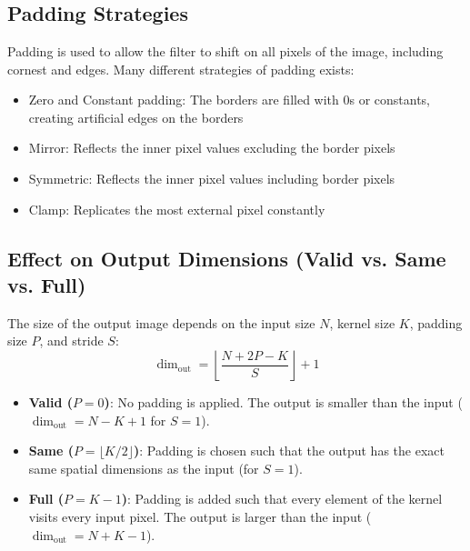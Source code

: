 
\section[Question -- {\it Padding}]{}

\subsection{Padding Strategies}

Padding is used to allow the filter to shift on all pixels of the image, including cornest and edges.
Many different strategies of padding exists:
\begin{itemize}
    \item Zero and Constant padding: The borders are filled with 0s or constants, creating artificial edges on the borders
    \item Mirror: Reflects the inner pixel values excluding the border pixels
    \item Symmetric: Reflects the inner pixel values including border pixels
    \item Clamp: Replicates the most external pixel constantly
\end{itemize}

\subsection{Effect on Output Dimensions (Valid vs. Same vs. Full)}
The size of the output image depends on the input size $N$, kernel size $K$, padding size $P$, and stride $S$:
\[
  \dim_{\text{out}} = \left\lfloor \frac{N + 2P - K}{S} \right\rfloor + 1
\]
\begin{itemize}
    \item \textbf{Valid ($P = 0$)}: No padding is applied. The output is smaller than the input ($\dim_{\text{out}} = N - K + 1$ for $S=1$).
    \item \textbf{Same ($P = \lfloor K/2 \rfloor$)}: Padding is chosen such that the output has the exact same spatial dimensions as the input (for $S=1$).
    \item \textbf{Full ($P = K - 1$)}: Padding is added such that every element of the kernel visits every input pixel. The output is larger than the input ($\dim_{\text{out}} = N + K - 1$).
\end{itemize}

